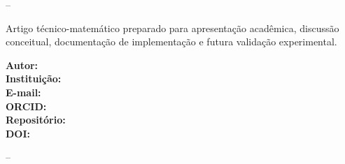 
\begin{titlepage}
  \begin{center}
    {\large \Instituicao}\par
    \vspace{2.2cm}
    {\large \Autor}\par
    \vfill
    {\bfseries\Large \TituloArtigo}\par
    \vspace{0.5cm}
    {\large \SubtituloArtigo}\par
    \vfill
    {\large \Cidade--\Estado}\par
    {\large \Ano}\par
  \end{center}
\end{titlepage}

\clearpage
\thispagestyle{empty}
\begin{center}
  {\large \Autor}\par
  \vspace{1.8cm}
  {\bfseries\Large \TituloArtigo}\par
  \vspace{0.5cm}
  {\large \SubtituloArtigo}\par
\end{center}

\vspace{1.8cm}
\begin{flushright}
\begin{minipage}{0.58\textwidth}
Artigo técnico-matemático preparado para apresentação acadêmica, discussão conceitual, documentação de implementação e futura validação experimental.

\vspace{0.6cm}
\textbf{Autor:} \Autor\\
\textbf{Instituição:} \Instituicao\\
\textbf{E-mail:} \EmailAutor\\
\textbf{ORCID:} \OrcidAutor\\
\textbf{Repositório:} \Repositorio\\
\textbf{DOI:} \DOIArtigo
\end{minipage}
\end{flushright}

\vfill
\begin{center}
\Cidade--\Estado\\
\Ano
\end{center}
\clearpage

